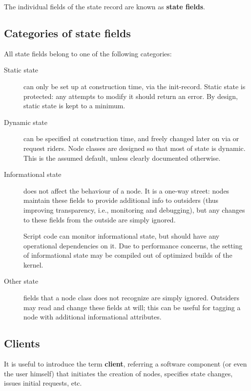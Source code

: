   The individual fields of the state record are known as {\bf state fields}.

\subsection{Categories of state fields}

  All state fields belong to one of the following categories:
  
  \begin{description}
  
  \item[Static state] can only be set up at construction time, via the
  init-record. Static state is protected: any attempts to modify it should
  return an error. By design, static state is kept to a minimum.

  \item[Dynamic state] can be specified at construction time, and freely
  changed later on via  or request riders. Node classes are
  designed so that most of state is dynamic. This is the assumed default,
  unless clearly documented otherwise.

  \item[Informational state] does not affect the behaviour of a node. It is a
  one-way street: nodes maintain these fields to provide additional info to
  outsiders (thus improving transparency, i.e., monitoring and debugging), but
  any changes to these fields from the outside are simply ignored.
  
  Script code can monitor informational state, but should have any operational 
  dependencies on it. Due to performance concerns, the setting of informational
  state may be compiled out of optimized builds of the kernel. 

  \item[Other state] fields that a node class does not recognize are simply
  ignored. Outsiders may read and change these fields at will; this can be
  useful for tagging a node with additional informational attributes.
  
  \end{description}
  
\subsection{Clients}
  
  It is useful to introduce the term {\bf client}, referring a software
  component (or even the user himself) that initiates the creation of nodes,
  specifies state changes, issues initial requests, etc.

